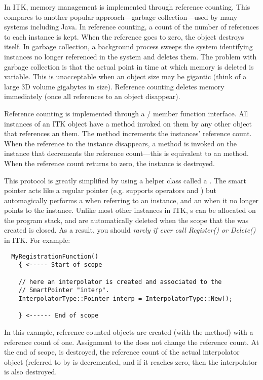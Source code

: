 In ITK, memory management is implemented through reference counting. This
compares to another popular approach---garbage collection---used by many
systems including Java. In reference counting, a count of the number of
references to each instance is kept. When the reference goes to zero, the
object destroys itself. In garbage collection, a background process sweeps
the system identifying instances no longer referenced in the system and
deletes them. The problem with garbage collection is that the actual point in
time at which memory is deleted is variable. This is unacceptable when an
object size may be gigantic (think of a large 3D volume gigabytes in
size). Reference counting deletes memory immediately (once all references to
an object disappear).

Reference counting is implemented through a /
member function interface.   All instances of an ITK object have a
 method invoked on them by any other object that references an
them. The  method increments the instances' reference
count. When the reference to the instance disappears, a 
method is invoked on the instance that decrements the reference count---this is equivalent to an
 method. When the
reference count returns to zero, the instance is destroyed.

This protocol is greatly simplified by using a helper class called a
. The smart pointer acts like a regular pointer
(e.g. supports operators \code{->} and \code{*}) but automagically
performs a  when referring to an instance, and an
 when it no longer points to the instance.  Unlike
most other instances in ITK, s can be allocated
on the program stack, and are automatically deleted when the scope
that the  was created is closed. As a result, you should
\emph{rarely if ever call Register() or Delete()} in ITK. For example:

\small
\begin{verbatim}
  MyRegistrationFunction()
    { <----- Start of scope

    // here an interpolator is created and associated to the
    // SmartPointer "interp".
    InterpolatorType::Pointer interp = InterpolatorType::New();

    } <------ End of scope
\end{verbatim}
\normalsize

In this example, reference counted objects are created (with the 
method) with a reference count of one. Assignment to the 
 does not change the reference count. At the end of scope,
 is destroyed, the reference count of the actual interpolator
object (referred to by  is decremented, and if it reaches zero,
then the interpolator is also destroyed.



